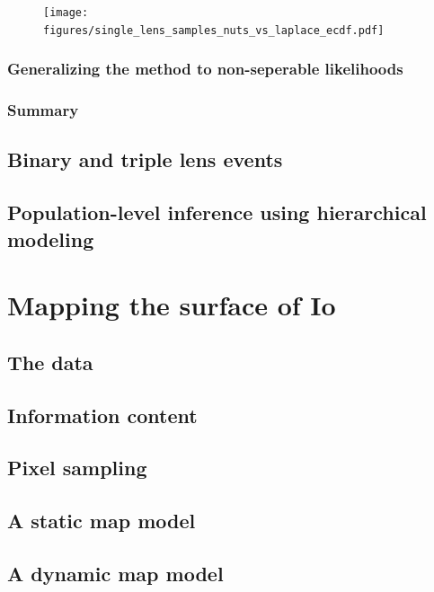 \documentclass[12pt,dvipsnames]{report}
\begin{document}
\begin{figure}[t]
    \begin{centering}
        \texttt{[image: figures/single\_lens\_samples\_nuts\_vs\_laplace\_ecdf.pdf]}
        \caption{}
            \label{fig:ogle_lightcurve_fit_nuts_vs_laplace_ecdf}
    \end{centering}
\end{figure}

\subsection{Generalizing the method to non-seperable likelihoods}
\label{ssec:generalizing_to_non_seperable_likelihoods}

\subsection{Summary}

\section{Binary and triple lens events}
\section{Population-level inference using hierarchical modeling}

\chapter{Mapping the surface of Io}
\label{ch:mapping_io}
\section{The data}
\section{Information content}
\section{Pixel sampling}
\section{A static map model}
\section{A dynamic map model}
\end{document}
